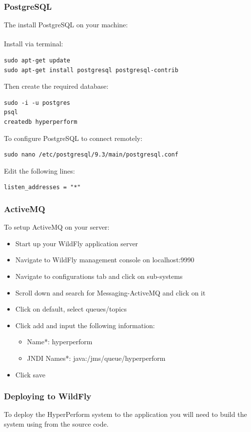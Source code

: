 \documentclass[11pt,a4paper]{article}
\begin{document}
\subsubsection{PostgreSQL}
The install PostgreSQL on your machine: \\\\
Install via terminal:
\begin{lstlisting}
sudo apt-get update
sudo apt-get install postgresql postgresql-contrib
\end{lstlisting}
Then create the required database:
\begin{lstlisting}
sudo -i -u postgres
psql
createdb hyperperform
\end{lstlisting}
To configure PostgreSQL to connect remotely:
\begin{lstlisting}
sudo nano /etc/postgresql/9.3/main/postgresql.conf
\end{lstlisting}
Edit the following lines:
\begin{lstlisting}
listen_addresses = "*"
\end{lstlisting}



\subsubsection{ActiveMQ}
To setup ActiveMQ on your server: \\
\begin{itemize}
	\item Start up your WildFly application server
	\item Navigate to WildFly management console on localhost:9990
	\item Navigate to configurations tab and click on sub-systems
	\item Scroll down and search for Messaging-ActiveMQ and click on it
	\item Click on default, select queues/topics
	\item Click add and input the following information:
		\begin{itemize}
			\item Name*: hyperperform
			\item JNDI Names*: java:/jms/queue/hyperperform
		\end{itemize}
	\item Click save \\
\end{itemize}

\subsubsection{Deploying to WildFly}
To deploy the HyperPerform system to the application you will need to build the system using from the source code. 
\end{document}
